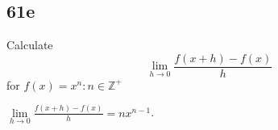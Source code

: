 \documentclass[../m134a-hw2.tex]{subfiles}
\begin{document}
\subsection*{61e}
Calculate \[\lim\limits_{h \to 0} \frac{f(x+h) - f(x)}{h}\]
for $f(x)=x^n : n \in \mathbb{Z}^+$ %




\begin{proposition}
    $\lim\limits_{h \to 0} \frac{f(x+h) - f(x)}{h} = nx^{n-1}$.
\end{proposition}
\end{document}
